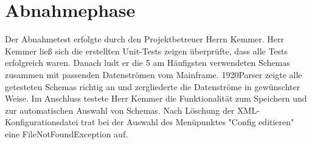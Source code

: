 \section{Abnahmephase} 
\label{sec:Abnahmephase}
Der Abnahmetest erfolgte durch den Projektbetreuer Herrn Kemmer. Herr Kemmer ließ sich die erstellten Unit-Tests zeigen überprüfte, dass alle Tests erfolgreich waren. Danach ludt er die 5 am Häufigsten verwendeten Schemas zusammen mit passenden Datenströmen vom Mainframe. 1920Parser zeigte alle getesteten Schemas richtig an und zergliederte die Datenströme in gewünschter Weise. Im Anschluss testete Herr Kemmer die Funktionalität zum Speichern und zur automatischen Auswahl von Schemas. Nach Löschung der XML-Konfigurationsdatei trat bei der Auswahl des Menüpunktes "Config editieren" eine FileNotFoundException auf.

